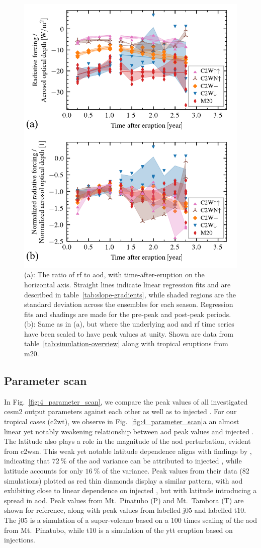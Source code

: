 \documentclass{ametsocV6.1}
\newcommand{\iso}[1][i]{{#1}njected \ce{SO2}}
\begin{document}
\begin{figure}
  \centering
  \includegraphics[width=0.5\linewidth]{figures/figure3.png}

  \caption{(a): The ratio of \gls{rf} to \gls{aod}, with time-after-eruption on the
    horizontal axis. Straight lines indicate linear regression fits and are described in
    table~\ref{tab:slope-gradients}, while shaded regions are the standard deviation across
    the ensembles for each season. Regression fits and shadings are made for the pre-peak
    and post-peak periods. (b): Same as in (a), but where the underlying \gls{aod} and
    \gls{rf} time series have been scaled to have peak values at unity. Shown are data from
    table~\ref{tab:simulation-overview} along with tropical eruptions from
    \gls{m20}.}\label{fig:3_rf_to_aod_ratios}%
\end{figure}

\subsection{Parameter scan}

In Fig.~\ref{fig:4_parameter_scan}, we compare the peak values of all investigated
\gls{cesm2} output parameters against each other as well as to \iso{}. For our tropical
cases (\gls{c2wt}), we observe in Fig.~\ref{fig:4_parameter_scan}a an almost linear yet
notably weakening relationship between \gls{aod} peak values and \iso{}. The latitude
also plays a role in the magnitude of the \gls{aod} perturbation, evident from
\gls{c2wsn}. This weak yet notable latitude dependence aligns with findings by
\citet{marshall2019}, indicating that \(\SI{72}{\percent}\) of the \gls{aod} variance
can be attributed to \iso{}, while latitude accounts for only \(\SI{16}{\percent}\) of
the variance. Peak values from their data (82 simulations) plotted as red thin diamonds
display a similar pattern, with \gls{aod} exhibiting close to linear dependence on
\iso{}, but with latitude introducing a spread in \gls{aod}. Peak values from Mt.\
Pinatubo (P) and Mt.\ Tambora (T) are shown for reference, along with peak values from
\citet{jones2005} labelled \gls{j05} and \citet{timmreck2010} labelled \gls{t10}. The
\gls{j05} is a simulation of a super-volcano based on a \(100\) times scaling of the
\gls{aod} from Mt.\ Pinatubo, while \gls{t10} is a simulation of the \gls{ytt} eruption
based on \ce{SO2} injections.
\end{document}
